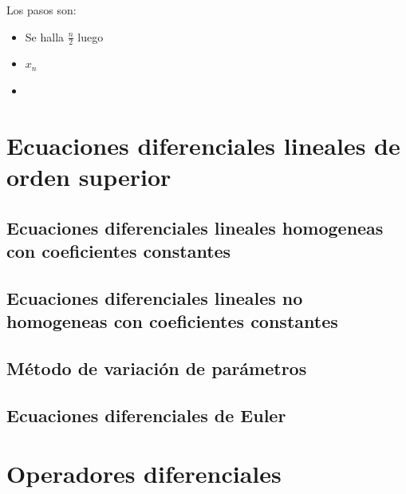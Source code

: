 \documentclass[10pt,]{krantz}
\theoremstyle{definition}
\theoremstyle{definition}
\theoremstyle{definition}
\theoremstyle{remark}
\begin{document}
Los pasos son:

\begin{itemize}
\item
  Se halla \(\frac{n}{2}\) luego
\item
  \(x_n\)
\item
\end{itemize}

\hypertarget{ecuaciones-diferenciales-lineales-de-orden-superior}{%
\chapter{Ecuaciones diferenciales lineales de orden superior}\label{ecuaciones-diferenciales-lineales-de-orden-superior}}

\hypertarget{ecuaciones-diferenciales-lineales-homogeneas-con-coeficientes-constantes}{%
\section{Ecuaciones diferenciales lineales homogeneas con coeficientes constantes}\label{ecuaciones-diferenciales-lineales-homogeneas-con-coeficientes-constantes}}

\hypertarget{ecuaciones-diferenciales-lineales-no-homogeneas-con-coeficientes-constantes}{%
\section{Ecuaciones diferenciales lineales no homogeneas con coeficientes constantes}\label{ecuaciones-diferenciales-lineales-no-homogeneas-con-coeficientes-constantes}}

\hypertarget{muxe9todo-de-variaciuxf3n-de-paruxe1metros}{%
\section{Método de variación de parámetros}\label{muxe9todo-de-variaciuxf3n-de-paruxe1metros}}

\hypertarget{ecuaciones-diferenciales-de-euler}{%
\section{Ecuaciones diferenciales de Euler}\label{ecuaciones-diferenciales-de-euler}}

\hypertarget{operadores-diferenciales}{%
\chapter{Operadores diferenciales}\label{operadores-diferenciales}}
\end{document}
